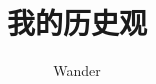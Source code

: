 \documentclass[12pt,oneside]{book}
\begin{document}
\title{我的历史观}
\author{Wander}

\makemytitleA
\end{document}
